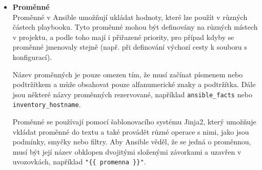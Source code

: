 \begin{itemize}
    Jednotlivé adresáře v roli mají specifický účel:
    \begin{itemize}
        \item \textbf{tasks} - obsahuje hlavní úlohy, které se mají provést, obvykle v souboru \texttt{main.yml}
        \item \textbf{handlers} - obsahuje úlohy, které se spustí pouze v případě, že jsou "vyvolány" z jiných úloh, například pro restart služby po změně konfigurace
        \item \textbf{templates} - obsahuje šablony, které se používají pro generování konfiguračních souborů na základě proměnných
        \item \textbf{files} - obsahuje statické soubory, které se mají zkopírovat na řízené uzly
        \item \textbf{vars} - obsahuje proměnné, které se mají použít v souboru \texttt{main.yml}
        \item \textbf{defaults} - obsahuje proměnné, které se mají použít v souboru \texttt{main.yml}, ale s nižší prioritou než proměnné v adresáři \texttt{vars}
        \item \textbf{meta} - obsahuje metadata o roli, jako jsou závislosti na jiných rolích
        \item \textbf{library} - obsahuje vlastní moduly, které mohou být použity v úlohách
        \item \textbf{module\_utils} - obsahuje pomocné funkce pro vlastní moduly
        \item \textbf{lookup\_plugins} - obsahuje vlastní lookup pluginy, které umožňují získávat data z různých zdrojů
    \end{itemize}

    \item \textbf{Proměnné} \\
    Proměnné v Ansible umožňují ukládat hodnoty, které lze použít v různých částech playbooku. 
    Tyto proměnné mohou být definovány na různých místech v projektu, a podle toho mají i přiřazené priority, pro případ kdyby se proměnné jmenovaly stejně (např. při definování výchozí cesty k souboru s konfigurací).  \cite{ansibledocs}

    Název proměnných je pouze omezen tím, že musí začínat písmenem nebo podtržítkem a může obsahovat pouze alfanumerické znaky a podtržítka.
    Dále jsou některé názvy proměnných rezervované, například \texttt{ansible\_facts} nebo \texttt{inventory\_hostname}. \cite{ansibledocs}
    
    Proměnné se používají pomocí šablonovacího systému Jinja2, který umožňuje vkládat proměnné do textu a také provádět různé operace s nimi, jako jsou podmínky, smyčky nebo filtry.
    Aby Ansible věděl, že se jedná o proměnnou, musí být její název obklopen dvojitými složenými závorkami a uzavřen v uvozovkách, například \texttt{"\{\{ promenna \}\}"}. \cite{ansibledocs}


\end{itemize}
